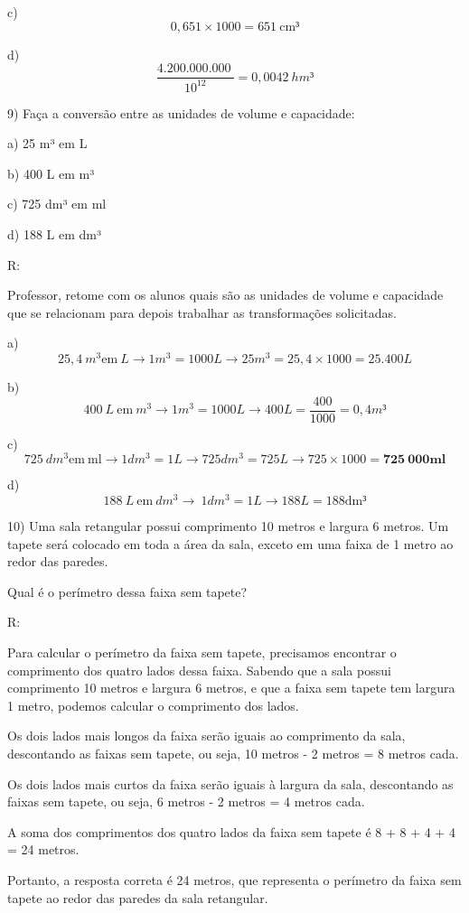 c) \[0,651 \times 1000 = 651\ \text{cm}³\]

d) \[\frac{4.200.000.000\ }{10^{12}} = 0,0042\ hm³\]

9) Faça a conversão entre as unidades de volume e capacidade:

a) 25 m³ em L

b) 400 L em m³

c) 725 dm³ em ml

d) 188 L em dm³

R:

Professor, retome com os alunos quais são as unidades de volume e
capacidade que se relacionam para depois trabalhar as transformações
solicitadas.

a)
\[25,4\ m^{3}\text{em}\ L \rightarrow 1m^{3} = 1000L \rightarrow 25m^{3} = 25,4 \times 1000 = 25.400L\]

b)
\[400\ L\ \text{em}\ m^{3} \rightarrow 1m^{3} = 1000L \rightarrow 400L = \frac{400}{1000} = 0,4m³\]

c)
\[725\ dm^{3}\text{em}\ \text{ml} \rightarrow 1dm^{3} = 1L \rightarrow 725dm^{3} = 725L \rightarrow 725 \times 1000 = \mathbf{725\ 000}\mathbf{\text{ml}}\]

d)
\[188\ L\ \text{em}\ dm^{3} \rightarrow \ 1dm^{3} = 1L \rightarrow 188L = 188\text{dm}³\]

10) Uma sala retangular possui comprimento 10 metros e largura 6 metros.
Um tapete será colocado em toda a área da sala, exceto em uma faixa de 1
metro ao redor das paredes.

Qual é o perímetro dessa faixa sem tapete?

R:

Para calcular o perímetro da faixa sem tapete, precisamos encontrar o
comprimento dos quatro lados dessa faixa. Sabendo que a sala possui
comprimento 10 metros e largura 6 metros, e que a faixa sem tapete tem
largura 1 metro, podemos calcular o comprimento dos lados.

Os dois lados mais longos da faixa serão iguais ao comprimento da sala,
descontando as faixas sem tapete, ou seja, 10 metros - 2 metros = 8
metros cada.

Os dois lados mais curtos da faixa serão iguais à largura da sala,
descontando as faixas sem tapete, ou seja, 6 metros - 2 metros = 4
metros cada.

A soma dos comprimentos dos quatro lados da faixa sem tapete é 8 + 8 + 4
+ 4 = 24 metros.

Portanto, a resposta correta é 24 metros, que representa o perímetro da
faixa sem tapete ao redor das paredes da sala retangular.

